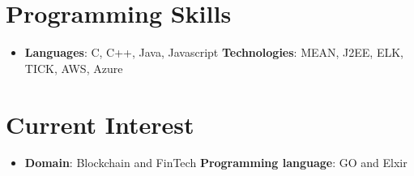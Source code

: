 \documentclass[letterpaper,11pt]{article}
\newcommand{\resumeSubHeadingListStart}{\begin{itemize}[leftmargin=*]}
\newcommand{\resumeSubHeadingListEnd}{\end{itemize}}
\begin{document}
\section{Programming Skills}
  \resumeSubHeadingListStart
    \item{
      \textbf{Languages}{: C, C++, Java, Javascript}
      \hfill
      \textbf{Technologies}{: MEAN, J2EE, ELK, TICK, AWS, Azure}
    }
  \resumeSubHeadingListEnd
  
\section{Current Interest}
  \resumeSubHeadingListStart
    \item{
      \textbf{Domain}{: Blockchain and FinTech}
      \hfill
      \textbf{Programming language}{: GO and Elxir}
    }
  \resumeSubHeadingListEnd


\end{document}
